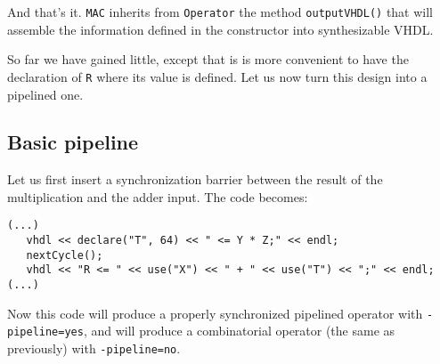 \documentclass{article}
\begin{document}
And that's it. \verb!MAC! inherits from \verb!Operator! the method
\verb!outputVHDL()! that will assemble the information defined in the
constructor into synthesizable VHDL.

So far we have gained little, except that is is more convenient to
have the declaration of \verb!R! where its value is defined. Let us
now turn this design into a pipelined one.


\subsection{Basic pipeline}


Let us first insert a synchronization barrier between the result of the multiplication and the adder input. The code becomes: 

\begin{verbatim}
(...)
   vhdl << declare("T", 64) << " <= Y * Z;" << endl;
   nextCycle();
   vhdl << "R <= " << use("X") << " + " << use("T") << ";" << endl;
(...)
\end{verbatim}

Now this code will produce a properly synchronized pipelined operator
with \verb!-pipeline=yes!, and will produce a combinatorial operator
(the same as previously) with \verb!-pipeline=no!.
\end{document}
